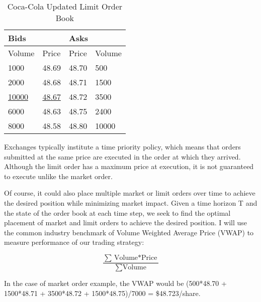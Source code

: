 \begin{table}[htbp]
\caption{Coca-Cola Updated Limit Order Book} \label{tab:coke2}
\begin{center}
\begin{tabular}{ll|ll}
\hline \hline
\multicolumn{2}{l|}{\textbf{Bids}} & \multicolumn{2}{l}{\textbf{Asks}} \\
\hline
Volume           & Price          & Price           & Volume          \\
\hline
1000             & 48.69          & 48.70           & 500             \\
2000             & 48.68          & 48.71           & 1500            \\
\underline{10000}             & \underline{48.67}          & 48.72           & 3500            \\
6000             & 48.63          & 48.75           & 2400            \\
8000             & 48.58          & 48.80           & 10000          
\end{tabular}
\end{center}
\end{table}

Exchanges typically institute a time priority policy, which means that orders submitted at the same price are executed in the order at which they arrived. Although the limit order has a maximum price at execution, it is not guaranteed to execute unlike the market order. 

Of course, it could also place multiple market or limit orders over time to achieve the desired position while minimizing market impact. Given a time horizon T and the state of the order book at each time step, we seek to find the optimal placement of market and limit orders to achieve the desired position. I will use the common industry benchmark of Volume Weighted Average Price (VWAP) to measure performance of our trading strategy:

$$ \frac{\sum{\text{Volume} * \text{Price}}}{\sum{\text{Volume}}}$$

In the case of market order example, the VWAP would be (500*48.70 + 1500*48.71 + 3500*48.72 + 1500*48.75)/7000 = \$48.723/share.

